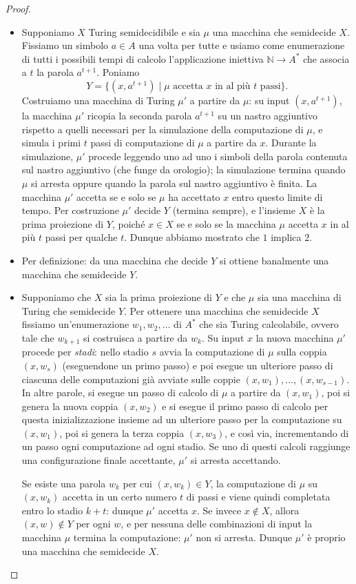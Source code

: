 \begin{proof}
\ 
\begin{itemize}
\item[$1\Rightarrow 2$] Supponiamo $X$ Turing semidecidibile e sia $\mu$ una macchina che semidecide $X$. Fissiamo un simbolo $a\in A$ una volta per tutte e usiamo come enumerazione di tutti i possibili tempi di calcolo l'applicazione iniettiva $\mathbb N\to A^*$ che associa a $t$ la parola $a^{t+1}$. Poniamo
\[
Y=\{(x,a^{t+1})\mid \mu \text{ accetta } x \text{ in al più } t \text{ passi}\}.
\]
Costruiamo una macchina di Turing $\mu'$ a partire da $\mu$: su input $(x,a^{t+1})$, la macchina $\mu'$ ricopia la seconda parola $a^{t+1}$ su un nastro aggiuntivo rispetto a quelli necessari per la simulazione della computazione di $\mu$, e simula i primi $t$ passi di computazione di $\mu$ a partire da $x$. Durante la simulazione, $\mu'$ procede leggendo uno ad uno i simboli della parola contenuta sul nastro aggiuntivo (che funge da orologio); la simulazione termina quando $\mu$ si arresta oppure quando la parola sul nastro aggiuntivo è finita. La macchina $\mu'$ accetta se e solo se $\mu$ ha accettato $x$ entro questo limite di tempo. Per costruzione $\mu'$ decide $Y$ (termina sempre), e l'insieme $X$ è la prima proiezione di $Y$, poiché $x\in X$ se e solo se la macchina $\mu$ accetta $x$ in al più $t$ passi per qualche $t$. Dunque abbiamo mostrato che $1$ implica $2$.
\item[$2\Rightarrow 3$] Per definizione: da una macchina che decide $Y$ si ottiene banalmente una macchina che semidecide $Y$.
\item[$3\Rightarrow 1$] Supponiamo che $X$ sia la prima proiezione di $Y$ e che $\mu$ sia una macchina di Turing che semidecide $Y$. Per ottenere una macchina che semidecide $X$ fissiamo un'enumerazione $w_1,w_2,\dots$ di $A^*$ che sia Turing calcolabile, ovvero tale che $w_{k+1}$ si costruisca a partire da $w_k$. Su input $x$ la nuova macchina $\mu'$ procede per \emph{stadi}: nello stadio $s$ avvia la computazione di $\mu$ sulla coppia $(x,w_s)$ (eseguendone un primo passo) e poi esegue un ulteriore passo di ciascuna delle computazioni già avviate sulle coppie $(x,w_1),\dots,(x,w_{s-1})$. In altre parole, si esegue un passo di calcolo di $\mu$ a partire da $(x,w_1)$, poi si genera la nuova coppia $(x,w_2)$ e si esegue il primo passo di calcolo per questa inizializzazione insieme ad un ulteriore passo per la computazione su $(x,w_1)$, poi si genera la terza coppia $(x,w_3)$, e così via, incrementando di un passo ogni computazione ad ogni stadio. Se uno di questi calcoli raggiunge una configurazione finale accettante, $\mu'$ si arresta accettando.

Se esiste una parola $w_k$ per cui $(x,w_k)\in Y$, la computazione di $\mu$ su $(x,w_k)$ accetta in un certo numero $t$ di passi e viene quindi completata entro lo stadio $k+t$: dunque $\mu'$ accetta $x$. Se invece $x\notin X$, allora $(x,w)\notin Y$ per ogni $w$, e per nessuna delle combinazioni di input la macchina $\mu$ termina la computazione: $\mu'$ non si arresta. Dunque $\mu'$ è proprio una macchina che semidecide $X$.\qedhere
\end{itemize}
\end{proof}

